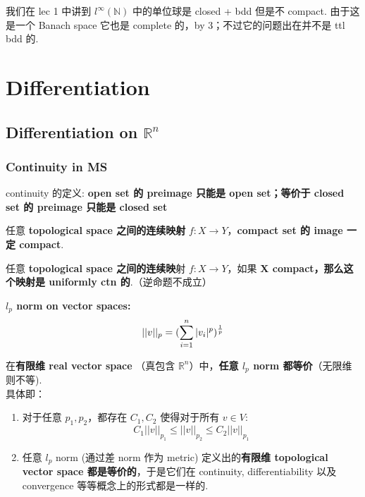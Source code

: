 \documentclass[lang=cn,11pt]{elegantbook}
\begin{document}
\begin{remark}
    我们在 lec 1 中讲到  $l^{\infty}(\mathbb{N})$ 中的单位球是 closed + bdd 但是不 compact. 由于这是一个 Banach space 它也是 complete 的，by 3；不过它的问题出在并不是 ttl bdd 的.
\end{remark}

   


\chapter{Differentiation}
\section{Differentiation on $\mathbb{R}^n$}
\subsection{Continuity in MS}
\begin{remark}
    continuity 的定义: \textbf{open set 的 preimage 只能是 open set；等价于 closed set 的 preimage 只能是 closed set}
\end{remark}


\begin{theorem}
任意\textbf{ topological space 之间的连续映射} $ f:X \rightarrow Y$，\textbf{compact set 的 image 一定 compact}.
\end{theorem}

\begin{theorem}
任意 \textbf{topological space 之间的连续映}射 $f:X \rightarrow Y$，如果 \textbf{X compact，那么这个映射是 uniformly ctn 的}.（逆命题不成立）
\end{theorem}

\begin{definition}
    \textbf{$l_p$ norm on vector spaces:}\\
$$||v||_p = (\sum_{i = 1}^n |v_i|^p)^{1\over p}$$
\end{definition}

\begin{theorem}
    在\textbf{有限维 real vector space} （真包含 $\mathbb{R}^n$）中，\textbf{任意 $l_p$ norm 都等价}（无限维则不等).\\
    具体即：
    \begin{enumerate}
        \item 对于任意 $p_1, p_2$，都存在 $C_1, C_2$ 使得对于所有 $v\in V$:
        $$
        C_1||v||_{p_1} \leq ||v||_{p_2} \leq C_2||v||_{p_1}
        $$
        \item 任意 $l_p$ norm (通过差 norm 作为 metric) 定义出的\textbf{有限维 topological vector space 都是等价的}，于是它们在 continuity, differentiability 以及 convergence 等等概念上的形式都是一样的.
    \end{enumerate}
\end{theorem}
\end{document}
